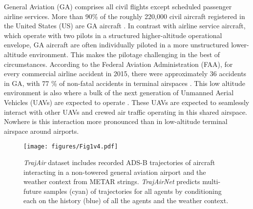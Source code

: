 \documentclass[letterpaper, 10 pt, conference]{ieeeconf}
\begin{document}
General Aviation (GA) comprises all civil flights except scheduled passenger airline services. More than 90\% of the roughly 220,000 civil aircraft registered in the United States (US) are GA aircraft \cite{federal-aviation-administration-2018}. In contrast with airline service aircraft, which operate with two pilots in a structured higher-altitude operational envelope, GA aircraft are often individually piloted in a more unstructured lower-altitude environment. This makes the pilotage challenging in the best of circumstances. According to the Federal Aviation Administration (FAA), for every commercial airline accident in 2015, there were approximately 36 accidents in GA, with 77 \% of non-fatal accidents in terminal airspaces \cite{national-transportation-safety-board-2015}. This low altitude environment is also where a bulk of the next generation of Unmanned Aerial Vehicles (UAVs) are expected to operate \cite{prevot2016uas}. These UAVs are expected to seamlessly interact with other UAVs and crewed air traffic operating in this shared airspace. Nowhere is this interaction more pronounced than in low-altitude terminal airspace around airports.




\begin{figure}[th]
    \centering
         \centering
        \texttt{[image: figures/Fig1v4.pdf]}
        \caption{ \textit{TrajAir} dataset includes recorded ADS-B trajectories of aircraft interacting in a non-towered general aviation airport and the weather context from METAR strings. \textit{TrajAirNet} predicts multi-future samples (cyan) of trajectories for all agents by conditioning each on the history (blue) of all the agents and the weather context.}
        \vspace{-3.5mm}
    \label{fig:overview}
\end{figure}
\end{document}
